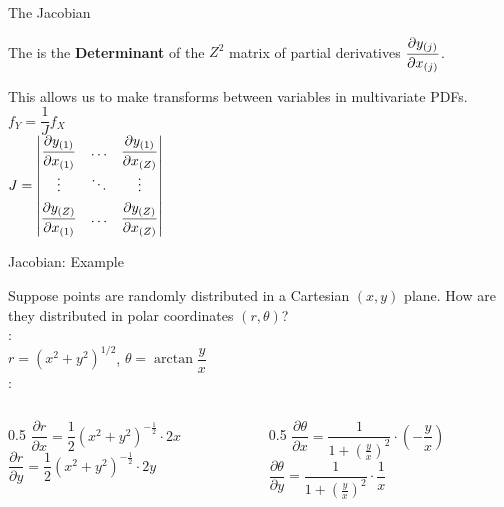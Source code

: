 \documentclass[10pt,sans,english,compress,table,xcolor=dvipsnames]{beamer}
\begin{document}
\begin{frame}{The Jacobian}

The  is the \textbf{Determinant} of the $Z^2$ matrix of partial derivatives $\dfrac{\partial y_{(j)}}{\partial x_{(j)}}$. 

This allows us to make transforms between variables in multivariate PDFs.\\[1ex]

$f_Y = \dfrac{1}{J} f_X$\\[2ex]


$J = \begin{vmatrix}
\dfrac{\partial y_{(1)}}{\partial x_{(1)}} &  \dots & \dfrac{\partial y_{(1)} }{\partial x_{(Z)}}\\[1ex]
\vdots & \ddots & \vdots \\[1ex]
\dfrac{\partial y_{(Z)} }{\partial x_{(1)}} &  \dots & \dfrac{\partial y_{(Z)} }{\partial x_{(Z)}} \\[1ex]
\end{vmatrix}
$


\end{frame}

\begin{frame}{Jacobian: Example}
\small

Suppose points are randomly distributed in a Cartesian $(x,y)$ plane. How are they distributed in polar coordinates $(r,\theta)$?\\[1ex]

:\\[1ex]
$r = (x^2 +y^2)^{1/2}$\;,\;\; $\theta = \arctan{\dfrac{y}{x}}$\\[1ex]

:\\[1ex]
\begin{columns}
\begin{column}{0.5\textwidth}
$\dfrac{\partial r}{\partial x} = \dfrac{1}{2}(x^2+y^2)^{-\frac{1}{2}}\cdot 2x$\\[1ex]
$\dfrac{\partial r}{\partial y} = \dfrac{1}{2}(x^2+y^2)^{-\frac{1}{2}}\cdot 2y$\\[1ex]
\end{column}
\begin{column}{0.5\textwidth}
$\dfrac{\partial \theta}{\partial x} = \dfrac{1}{1+(\frac{y}{x})^2}\cdot\left (-\dfrac{y}{x}\right)$\\[1ex]
$\dfrac{\partial \theta}{\partial y} = \dfrac{1}{1+(\frac{y}{x})^2}\cdot\dfrac{1}{x}$\\[1ex]
\end{column}
\end{columns}
\end{frame}
\end{document}
